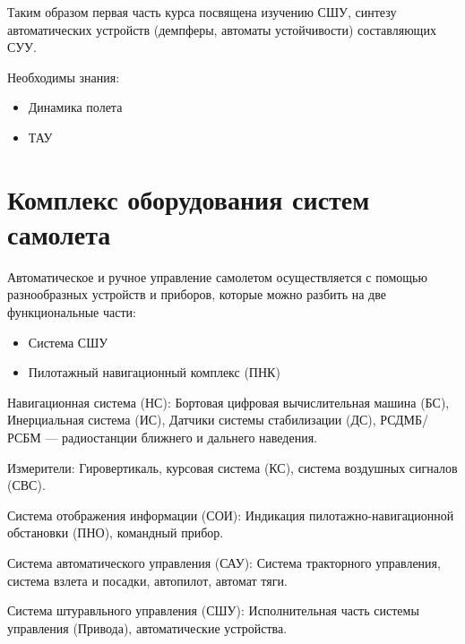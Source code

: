 \documentclass{article}
\begin{document}
Таким образом первая часть курса посвящена изучению СШУ, синтезу автоматических
устройств (демпферы, автоматы устойчивости) составляющих СУУ.

Необходимы знания:
\begin{itemize}
	\item Динамика полета
	\item ТАУ
\end{itemize}
\newpage

\section{Комплекс оборудования систем самолета}

Автоматическое и ручное управление самолетом осуществляется с помощью
разнообразных устройств и приборов, которые можно разбить на две функциональные
части:
\begin{itemize}
	\item{Система СШУ}
	\item{Пилотажный навигационный комплекс (ПНК)}
\end{itemize}

Навигационная система (НС): Бортовая цифровая вычислительная машина (БС),
Инерциальная система (ИС), Датчики системы стабилизации (ДС), РСДМБ/РСБМ ---
радиостанции ближнего и дальнего наведения.

Измерители: Гировертикаль, курсовая система (КС), система воздушных сигналов
(СВС).

Система отображения информации (СОИ): Индикация пилотажно-навигационной
обстановки (ПНО), командный прибор.

Система автоматического управления (САУ): Система тракторного управления,
система взлета и посадки, автопилот, автомат тяги.

Система штуравльного управления (СШУ): Исполнительная часть системы управления
(Привода), автоматические устройства.
\end{document}
